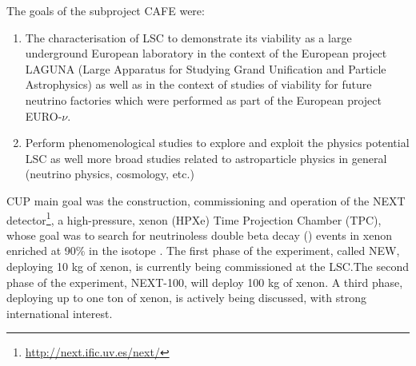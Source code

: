 \documentclass[a4paper,11pt,oneside]{article}
\begin{document}
The goals of the subproject CAFE were:
\begin{enumerate}
\item The characterisation of LSC to demonstrate its viability 
as a large underground European laboratory in the context of
the European project LAGUNA (Large Apparatus for Studying Grand
Unification and Particle Astrophysics) as well as in the context
of studies of viability for future neutrino factories which were
performed as part of the European project EURO-$\nu$.
\item Perform phenomenological studies to explore and exploit 
the physics potential LSC  as well more broad studies related
to astroparticle physics in general (neutrino physics, cosmology, etc.)
\end{enumerate}


%

CUP main goal was the construction, commissioning and operation of the NEXT detector\footnote{\url{http://next.ific.uv.es/next/}}, a high-pressure, xenon (HPXe) Time Projection Chamber (TPC), whose goal was to search for neutrinoless double beta decay  (\bbonu) events in xenon enriched at 90\% in the isotope \XE. The first phase of the experiment, called NEW, deploying 10 kg of xenon, is currently being commissioned at the LSC.The second phase of the experiment, NEXT-100, will deploy 100 kg of xenon. A third phase, deploying up to one ton of xenon, is actively being discussed, with strong international interest.
 
\end{document}
